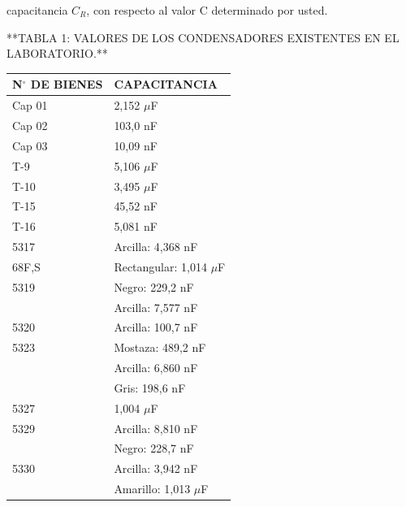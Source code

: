 \documentclass[11pt,a4paper]{article}
\begin{document}
capacitancia $C_R$, con respecto al valor C determinado por usted.

**TABLA 1: VALORES DE LOS CONDENSADORES EXISTENTES EN EL LABORATORIO.**

\begin{center}\small
\begin{tabular}{ll}
\toprule
N$^{\circ}$ DE BIENES & CAPACITANCIA \\
\midrule
Cap 01 & 2,152 $\mu$F \\
Cap 02 & 103,0 nF \\
Cap 03 & 10,09 nF \\
T-9 & 5,106 $\mu$F \\
T-10 & 3,495 $\mu$F \\
T-15 & 45,52 nF \\
T-16 & 5,081 nF \\
5317 & Arcilla: 4,368 nF \\
68F,S & Rectangular: 1,014 $\mu$F \\
5319 & Negro: 229,2 nF \\
 & Arcilla: 7,577 nF \\
5320 & Arcilla: 100,7 nF \\
5323 & Mostaza: 489,2 nF \\
 & Arcilla: 6,860 nF \\
 & Gris: 198,6 nF \\
5327 & 1,004 $\mu$F \\
5329 & Arcilla: 8,810 nF \\
 & Negro: 228,7 nF \\
5330 & Arcilla: 3,942 nF \\
 & Amarillo: 1,013 $\mu$F \\
\bottomrule
\end{tabular}
\end{center}
\end{document}
